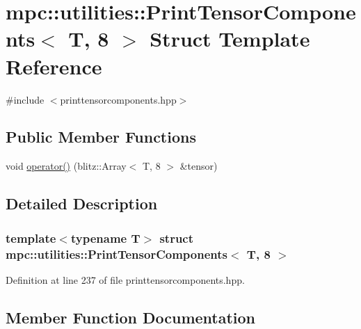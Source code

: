 \hypertarget{structmpc_1_1utilities_1_1_print_tensor_components_3_01_t_00_018_01_4}{}\section{mpc\+:\+:utilities\+:\+:Print\+Tensor\+Components$<$ T, 8 $>$ Struct Template Reference}
\label{structmpc_1_1utilities_1_1_print_tensor_components_3_01_t_00_018_01_4}


{\ttfamily \#include $<$printtensorcomponents.\+hpp$>$}

\subsection*{Public Member Functions}
\begin{DoxyCompactItemize}
\item 
void \mbox{\hyperlink{structmpc_1_1utilities_1_1_print_tensor_components_3_01_t_00_018_01_4_a4a099623dcbef00f62c0ec6d7e7cd113}{operator()}} (blitz\+::\+Array$<$ T, 8 $>$ \&tensor)
\end{DoxyCompactItemize}


\subsection{Detailed Description}
\subsubsection*{template$<$typename T$>$\newline
struct mpc\+::utilities\+::\+Print\+Tensor\+Components$<$ T, 8 $>$}



Definition at line 237 of file printtensorcomponents.\+hpp.



\subsection{Member Function Documentation}
\mbox{\label{structmpc_1_1utilities_1_1_print_tensor_components_3_01_t_00_018_01_4_a4a099623dcbef00f62c0ec6d7e7cd113}} 
